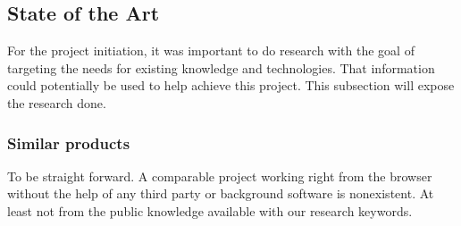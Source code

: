 
\subsection{State of the Art}
For the project initiation, it was important to do research with the goal of targeting the needs for existing knowledge and technologies. That information could potentially be used to help achieve this project. This subsection will expose the research done.

\subsubsection{Similar products}
To be straight forward. A comparable project working right from the browser without the help of any third party or background software is nonexistent. At least not from the public knowledge available with our research keywords.













